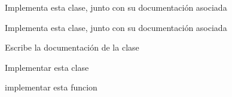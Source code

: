 
\begin{DoxyRefList}
\item[\label{todo__todo000003}%
\hypertarget{todo__todo000003}{}%
Clase \hyperlink{classconjunto}{conjunto} ]Implementa esta clase, junto con su documentación asociada  
\item[\label{todo__todo000002}%
\hypertarget{todo__todo000002}{}%
Clase \hyperlink{classcrimen}{crimen} ]Implementa esta clase, junto con su documentación asociada 
\item[\label{todo__todo000001}%
\hypertarget{todo__todo000001}{}%
Clase \hyperlink{classfecha}{fecha} ]Escribe la documentación de la clase 

Implementar esta clase 
\item[\label{todo__todo000004}%
\hypertarget{todo__todo000004}{}%
global\+Scope$>$ Miembro \hyperlink{conjunto_8h_ae54b721035471d372f29c0335c42734a}{operator$<$$<$} (ostream \&sal, const conjunto \&D)]implementar esta funcion 
\end{DoxyRefList}